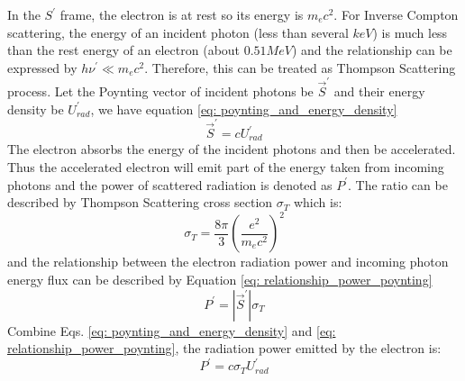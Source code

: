 \documentclass[12pt]{report}
\begin{document}
            In the $S^{\prime}$ frame, the electron is at rest so its energy is $m_e c^2$. 
            For Inverse Compton scattering, the energy of an incident photon 
            (less than several $keV$) is much less than the rest energy of an electron 
            (about $0.51MeV$) and the relationship can be expressed by 
            $h\nu^{\prime} \ll m_e c^2$. Therefore, this can be treated as Thompson 
            Scattering process. Let the Poynting vector of incident photons be 
            $\vec{S}^{\prime}$ and their energy density be $U_{rad}^{\prime}$, we have 
            equation \ref{eq: poynting_and_energy_density}
            \begin{equation}
              \label{eq: poynting_and_energy_density}
              \vec{S}^{\prime} = c U_{rad}^{\prime}
            \end{equation}
            The electron absorbs the energy of the incident photons and then be accelerated. 
            Thus the accelerated electron will emit part of the energy taken from incoming 
            photons and the power of scattered radiation is denoted as $P^{\prime}$.
            The ratio can be described by Thompson Scattering cross section $\sigma_{T}$ 
            which is:
            \begin{equation}
              \label{eq: thompson_cross_section}
              \sigma_{T} = \frac{8\pi}{3} \left(\frac{e^2}{m_e c^2}\right)^2
            \end{equation}
            and the relationship between the electron radiation power and incoming photon 
            energy flux can be described by Equation \ref{eq: relationship_power_poynting}
            \begin{equation}
              \label{eq: relationship_power_poynting}
              P^{\prime} = \left| \vec{S}^{\prime} \right| \sigma_{T}
            \end{equation}
            Combine Eqs. \ref{eq: poynting_and_energy_density} and 
            \ref{eq: relationship_power_poynting}, the radiation power emitted by the 
            electron is: 
            \begin{equation}
              \label{eq: final_relationship}
              P^{\prime} = c \sigma_{T} U^{\prime}_{rad}
            \end{equation}
\end{document}
